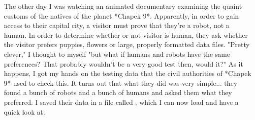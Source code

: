 The other day I was watching an animated documentary examining the quaint customs of the natives of the planet *Chapek 9*. Apparently, in order to gain access to their capital city, a visitor must prove that they're a robot, not a human. In order to determine whether or not visitor is human, they ask whether the visitor prefers puppies, flowers or large, properly formatted data files. "Pretty clever," I thought to myself "but what if humans and robots have the same preferences? That probably wouldn't be a very good test then, would it?" As it happens, I got my hands on the testing data that the civil authorities of *Chapek 9* used to check this. It turns out that what they did was very simple... they found a bunch of robots and a bunch of humans and asked them what they preferred. I saved their data in a file called , which I can now load and have a quick look at:

